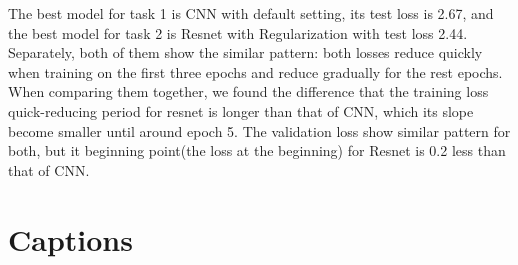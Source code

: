 \documentclass{article}
\begin{document}
    The best model for task 1 is CNN with default setting, its test loss is 2.67, and the best model for task 2 is Resnet with Regularization with test loss 2.44.\\
    Separately, both of them show the similar pattern: both losses reduce quickly when training on the first three epochs and reduce gradually for the rest epochs.
    When comparing them together, we found the difference that the training loss quick-reducing period for resnet is longer than that of CNN, which its slope become smaller until around epoch 5.
    The validation loss show similar pattern for both, but it beginning point(the loss at the beginning) for Resnet is 0.2 less than that of CNN.

    \section{Captions}

\end{document}
